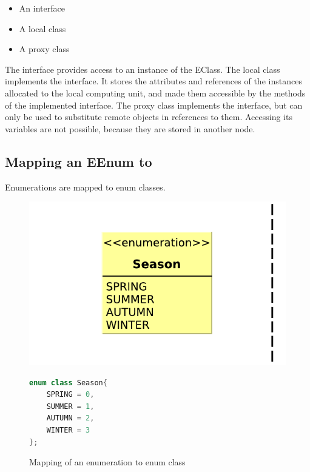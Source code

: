 \begin{itemize}
	\item An interface
	\item A local class
	\item A proxy class
\end{itemize}


The interface provides access to an instance of the EClass. 
The local class implements the interface. It stores the attributes and references of the instances allocated to the local computing unit, and made them accessible by the methods of the implemented interface.
The proxy class implements the interface, but can only be used to substitute remote objects in references to them. 
Accessing its variables are not possible, because they are stored in another node. 

\subsection{Mapping an EEnum to \protect\cpp }

Enumerations are mapped to \cpp{} enum classes.

\begin{figure}
	\begin{center}
		
		\begin{minipage}[c]{\textwidth}
		\begin{minipage}[c]{0.41\textwidth}
			\includegraphics[width=\textwidth]{figures/eenum-to-cpp.pdf}
		\end{minipage}
			\hspace{0.05\textwidth}
		\begin{minipage}[c]{0.25\textwidth}

\begin{lstlisting}[language=C++]
enum class Season{
	SPRING = 0,
	SUMMER = 1,
	AUTUMN = 2,
	WINTER = 3
};
\end{lstlisting}			
		\end{minipage}
		\end{minipage}
		\caption{Mapping of an enumeration to \protect\cpp{} enum class }
		\label{fig:eenum-to-cpp}
	\end{center}
\end{figure}

